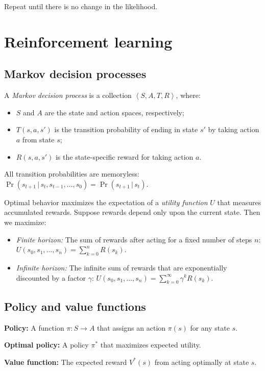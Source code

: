 \documentclass[a4paper]{article}
\begin{document}
        Repeat until there is no change in the likelihood.

\section{Reinforcement learning}
    \subsection{Markov decision processes}
        A \emph{Markov decision process} is a collection $\left\langle S, A, T, R \right\rangle$, where:
        \begin{itemize}
            \item $S$ and $A$ are the state and action spaces, respectively;
            \item $T(s, a, s')$ is the transition probability of ending in state $s'$ by taking action $a$ from state $s$;
            \item $R(s, a, s')$ is the state-specific reward for taking action $a$.
        \end{itemize}
        All transition probabilities are memoryless: $\Pr{(s_{t+1} \,|\, s_t, s_{t-1}, \dots, s_0)} = \Pr{(s_{t+1} \,|\, s_t)}$.

        Optimal behavior maximizes the expectation of a \emph{utility function} $U$ that measures accumulated rewards.
        Suppose rewards depend only upon the current state.
        Then we maximize:
        \begin{itemize}
            \item \emph{Finite horizon:} The sum of rewards after acting for a fixed number of steps $n$: $U(s_0, s_1, \dots, s_n) = \sum_{k=0}^{n} R(s_k)$.
            \item \emph{Infinite horizon:} The infinite sum of rewards that are exponentially discounted by a factor $\gamma$: $U(s_0, s_1, \dots, s_n) = \sum_{k=0}^{\infty} \gamma^k R(s_k)$.
        \end{itemize}
    
    \subsection{Policy and value functions}
        \textbf{Policy:} A function $\pi: S \rightarrow A$ that assigns an action $\pi(s)$ for any state $s$.

        \textbf{Optimal policy:} A policy $\pi^\ast$ that maximizes expected utility.

        \textbf{Value function:} The expected reward $V^\ast(s)$ from acting optimally at state $s$.
\end{document}
